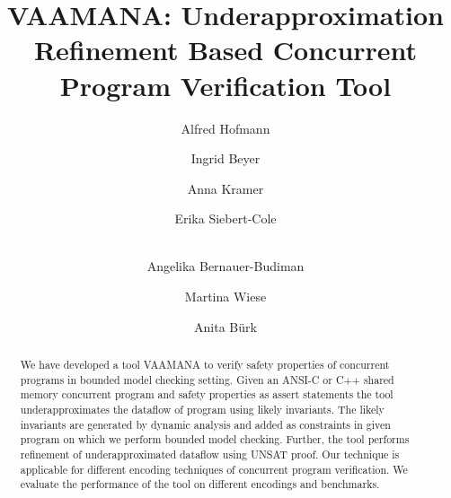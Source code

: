 \documentclass{llncs}
\begin{document}
\pagestyle{empty}

\mainmatter

\title{VAAMANA: Underapproximation Refinement Based Concurrent Program Verification Tool}

\author{Alfred Hofmann
\and Ingrid Beyer \and
Anna Kramer \and Erika Siebert-Cole \and\\
Angelika Bernauer-Budiman \and
Martina Wiese \and Anita B\"urk}



\maketitle

\begin{abstract}
We have developed a tool VAAMANA to verify safety properties of concurrent programs 
in bounded model checking setting. Given an ANSI-C or C++ shared memory 
concurrent program and safety properties as assert statements the tool 
underapproximates the dataflow of program using likely invariants. The 
likely invariants are generated by dynamic analysis and added as 
constraints in given program on which we perform bounded model checking. 
Further, the tool performs refinement of underapproximated dataflow using 
UNSAT proof. Our technique is applicable for different encoding techniques 
of concurrent program verification. We evaluate the performance of the tool 
on different encodings and benchmarks.
\end{abstract}
\end{document}
